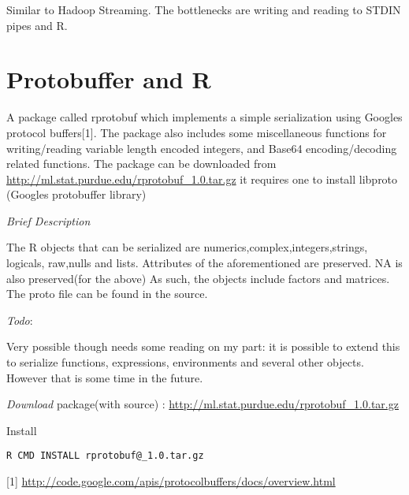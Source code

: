 \documentclass[letterpaper,10pt,english]{manual}
\begin{document}
Similar to Hadoop Streaming. The bottlenecks are writing and reading to STDIN
pipes and R.

\resetcurrentobjects
\hypertarget{--doc-ProtoBuffers}{}

\chapter{Protobuffer and R}

A package called rprotobuf which implements a simple serialization using Googles
protocol buffers{[}1{]}.  The package also includes some miscellaneous functions for
writing/reading variable length encoded integers, and Base64 encoding/decoding
related functions.  The package can be downloaded from
\href{http://ml.stat.purdue.edu/rprotobuf\_1.0.tar.gz}{http://ml.stat.purdue.edu/rprotobuf\_1.0.tar.gz} it requires one to install libproto
(Googles protobuffer library)

\emph{Brief Description}

The R objects that can be serialized are numerics,complex,integers,strings, logicals,
raw,nulls and lists.  Attributes of the aforementioned are preserved. NA is also
preserved(for the above) As such, the objects include factors and matrices.  The proto file can be
found in the source.

\emph{Todo}:

Very possible though needs some reading on my part: it is possible to
extend this to serialize functions, expressions, environments and several
other objects.  However that is some time in the future.

\emph{Download}
package(with source) : \href{http://ml.stat.purdue.edu/rprotobuf\_1.0.tar.gz}{http://ml.stat.purdue.edu/rprotobuf\_1.0.tar.gz}

Install

\begin{Verbatim}[commandchars=@\[\]]
R CMD INSTALL rprotobuf@_1.0.tar.gz
\end{Verbatim}

{[}1{]} \href{http://code.google.com/apis/protocolbuffers/docs/overview.html}{http://code.google.com/apis/protocolbuffers/docs/overview.html}


\renewcommand{\indexname}{Module Index}
\printmodindex
\renewcommand{\indexname}{Index}
\printindex
\end{document}
